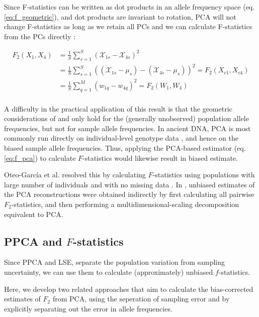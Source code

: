 \documentclass[12pt, letterpaper]{article}
\begin{document}
Since F-statistics can be written as dot products in an allele frequency space (eq. \ref{eq:f_geometric}), and dot products are invariant to rotation, PCA will not change F-statistics as long as we retain all PCs and we can calculate F-statistics from the PCs directly \cite{peter_geometric_2022}:

\begin{align}\label{eq:f_pca}
F_2(X_1,X_4) &= \frac{1}{S}\sum_{s=1}^S(\mathcal{X}_{1s} - \mathcal{X}_{4s})^2\nonumber\\
&= \frac{1}{S}\sum_{s=1}^S\left((\mathcal{X}_{1s} - \mu_s)- (\mathcal{X}_{4s} - \mu_s)\right)^2 = F_2(X_{c1},X_{c4})\nonumber\\
&=\frac{1}{S} \sum_{q=1}^M(w_{1q} - w_{4q})^2 = F_2(W_1,W_4)\nonumber\\
\end{align}

A difficulty in the practical application of this result is that the geometric considerations of \cite{oteo-garcia_geometrical_2021} and \cite{peter_geometric_2022} only hold for the (generally unobserved) population allele frequencies, but not for sample allele frequencies. In ancient DNA, PCA is most commonly run directly on individual-level genotype data \cite{patterson_population_2006}, and hence on the biased sample allele frequencies. Thus, applying the PCA-based estimator (eq. \ref{eq:f_pca}) to calculate $F$-statistics would likewise result in biased estimate.


Oteo-García et al. resolved this by calculating $F$-statistics using populations with large number of individuals and with no missing data \cite{oteo-garcia_geometrical_2021}. In \cite{peter_geometric_2022}, unbiased estimates of the PCA reconstructions were obtained indirectly by first calculating all pairwise $F_2$-statistics, and then performing a multidimensional-scaling decomposition equivalent to PCA. 

\subsection{PPCA and $F$-statistics}\label{theory-ppca}
Since PPCA and LSE, separate the population variation from sampling uncertainty, we  can use them to calculate (approximately) unbiased $f$-statistics.

Here, we develop two related approaches that aim to calculate the bias-corrected estimates of $F_2$ from  PCA, using the seperation of sampling error and by explicitly separating out the error in allele frequencies.
\end{document}
